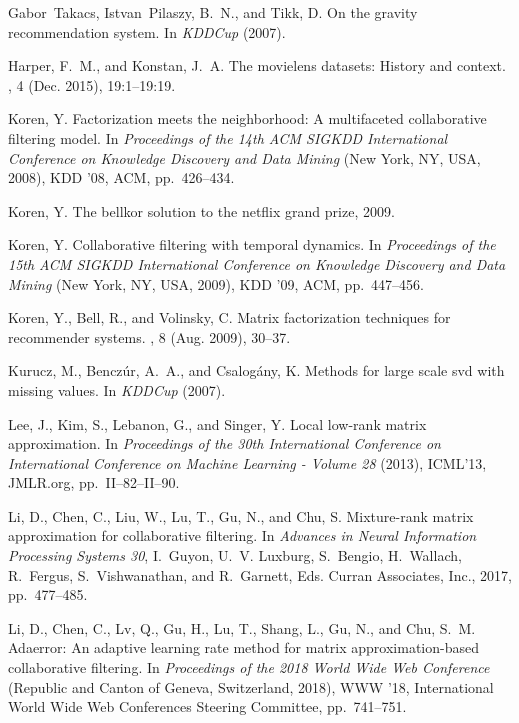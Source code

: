 \documentclass{article}
\begin{document}
\begin{thebibliography}{10}
{\sc Gabor~Takacs, Istvan~Pilaszy, B.~N., and Tikk, D.}
\newblock On the gravity recommendation system.
\newblock In {\em KDDCup\/} (2007).

{\sc Harper, F.~M., and Konstan, J.~A.}
\newblock The movielens datasets: History and context.
, 4 (Dec. 2015),
  19:1--19:19.

{\sc Koren, Y.}
\newblock Factorization meets the neighborhood: A multifaceted collaborative
  filtering model.
\newblock In {\em Proceedings of the 14th ACM SIGKDD International Conference
  on Knowledge Discovery and Data Mining\/} (New York, NY, USA, 2008), KDD '08,
  ACM, pp.~426--434.

{\sc Koren, Y.}
\newblock The bellkor solution to the netflix grand prize, 2009.

{\sc Koren, Y.}
\newblock Collaborative filtering with temporal dynamics.
\newblock In {\em Proceedings of the 15th ACM SIGKDD International Conference
  on Knowledge Discovery and Data Mining\/} (New York, NY, USA, 2009), KDD '09,
  ACM, pp.~447--456.

{\sc Koren, Y., Bell, R., and Volinsky, C.}
\newblock Matrix factorization techniques for recommender systems.
, 8 (Aug. 2009), 30--37.

{\sc Kurucz, M., Benczúr, A.~A., and Csalogány, K.}
\newblock Methods for large scale svd with missing values.
\newblock In {\em KDDCup\/} (2007).

{\sc Lee, J., Kim, S., Lebanon, G., and Singer, Y.}
\newblock Local low-rank matrix approximation.
\newblock In {\em Proceedings of the 30th International Conference on
  International Conference on Machine Learning - Volume 28\/} (2013), ICML'13,
  JMLR.org, pp.~II--82--II--90.

{\sc Li, D., Chen, C., Liu, W., Lu, T., Gu, N., and Chu, S.}
\newblock Mixture-rank matrix approximation for collaborative filtering.
\newblock In {\em Advances in Neural Information Processing Systems 30},
  I.~Guyon, U.~V. Luxburg, S.~Bengio, H.~Wallach, R.~Fergus, S.~Vishwanathan,
  and R.~Garnett, Eds. Curran Associates, Inc., 2017, pp.~477--485.

{\sc Li, D., Chen, C., Lv, Q., Gu, H., Lu, T., Shang, L., Gu, N., and Chu,
  S.~M.}
\newblock Adaerror: An adaptive learning rate method for matrix
  approximation-based collaborative filtering.
\newblock In {\em Proceedings of the 2018 World Wide Web Conference\/}
  (Republic and Canton of Geneva, Switzerland, 2018), WWW '18, International
  World Wide Web Conferences Steering Committee, pp.~741--751.


\end{thebibliography}
\end{document}
